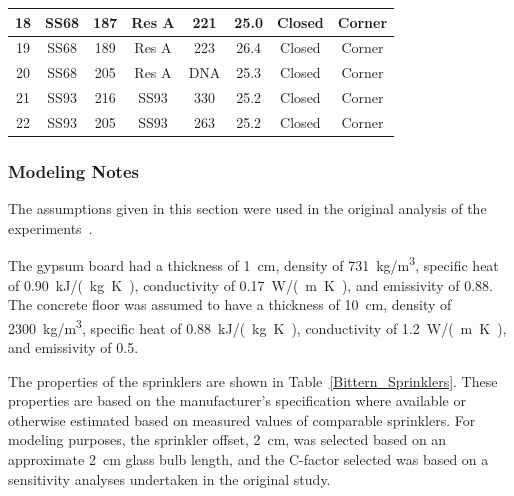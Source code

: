 \begin{table}[!ht]
\begin{tabular}{|c|c|c|c|c|c|c|c|}
18   & SS68   & 187      & Res A  & 221      & 25.0              & Closed & Corner        \\ \hline
19   & SS68   & 189      & Res A  & 223      & 26.4              & Closed & Corner        \\ \hline
20   & SS68   & 205      & Res A  & DNA      & 25.3              & Closed & Corner        \\ \hline
21   & SS93   & 216      & SS93   & 330      & 25.2              & Closed & Corner        \\ \hline
22   & SS93   & 205      & SS93   & 263      & 25.2              & Closed & Corner        \\ \hline
\end{tabular}
\end{table}

\subsubsection{Modeling Notes}

The assumptions given in this section were used in the original analysis of the experiments~\cite{Bittern:Thesis}.

The gypsum board had a thickness of 1~cm, density of 731~kg/m\textsuperscript{3}, specific heat of 0.90~\unit{kJ/(kg.K)}, conductivity of 0.17~\unit{W/(m.K)}, and emissivity of 0.88. The concrete floor was assumed to have a thickness of 10~cm, density of 2300~\unit{kg/m^3}, specific heat of 0.88~\unit{kJ/(kg.K)}, conductivity of 1.2~\unit{W/(m.K)}, and emissivity of 0.5.

The properties of the sprinklers are shown in Table~\ref{Bittern_Sprinklers}. These properties are based on the manufacturer's specification where available or otherwise estimated based on measured values of comparable sprinklers. For modeling purposes, the sprinkler offset, 2~cm, was selected based on an approximate 2~cm glass bulb length, and the C-factor selected was based on a sensitivity analyses undertaken in the original study.

